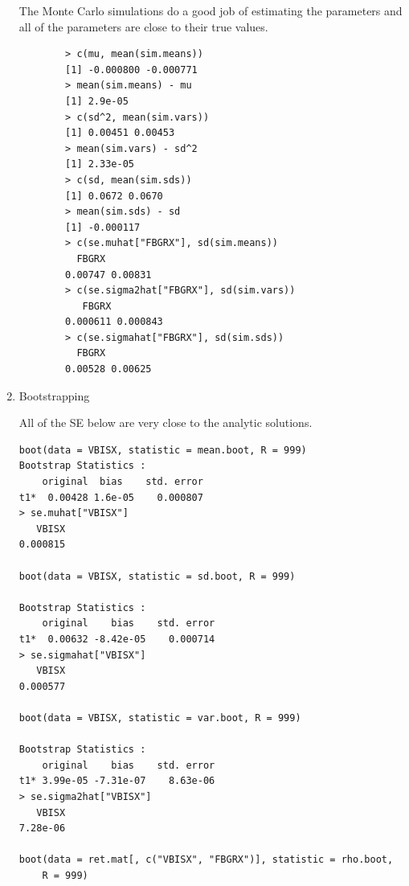 \documentclass[letterpaper,12pt]{article}
\begin{document}
\begin{enumerate}
The Monte Carlo simulations do a good job of estimating the parameters and all of the parameters are close to their true values. \\ 
\begin{lstlisting}
        > c(mu, mean(sim.means))
        [1] -0.000800 -0.000771
        > mean(sim.means) - mu
        [1] 2.9e-05
        > c(sd^2, mean(sim.vars))
        [1] 0.00451 0.00453
        > mean(sim.vars) - sd^2
        [1] 2.33e-05
        > c(sd, mean(sim.sds))
        [1] 0.0672 0.0670
        > mean(sim.sds) - sd
        [1] -0.000117
        > c(se.muhat["FBGRX"], sd(sim.means))
          FBGRX         
        0.00747 0.00831 
        > c(se.sigma2hat["FBGRX"], sd(sim.vars)) 
           FBGRX          
        0.000611 0.000843 
        > c(se.sigmahat["FBGRX"], sd(sim.sds))
          FBGRX         
        0.00528 0.00625
\end{lstlisting}

\item Bootstrapping

All of the SE below are very close to the analytic solutions. 
\begin{lstlisting}
boot(data = VBISX, statistic = mean.boot, R = 999)
Bootstrap Statistics :
    original  bias    std. error
t1*  0.00428 1.6e-05    0.000807
> se.muhat["VBISX"]
   VBISX 
0.000815 

boot(data = VBISX, statistic = sd.boot, R = 999)

Bootstrap Statistics :
    original    bias    std. error
t1*  0.00632 -8.42e-05    0.000714
> se.sigmahat["VBISX"]
   VBISX 
0.000577

boot(data = VBISX, statistic = var.boot, R = 999)

Bootstrap Statistics :
    original    bias    std. error
t1* 3.99e-05 -7.31e-07    8.63e-06
> se.sigma2hat["VBISX"]
   VBISX 
7.28e-06

boot(data = ret.mat[, c("VBISX", "FBGRX")], statistic = rho.boot, 
    R = 999)



\end{lstlisting}
\end{enumerate}
\end{document}
